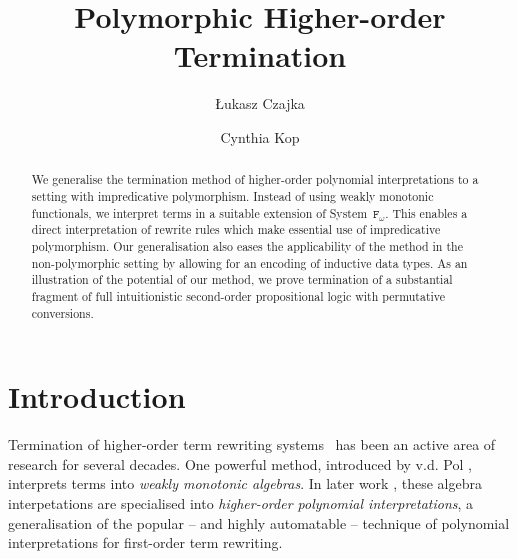 \documentclass[a4paper,UKenglish,cleveref,autoref,numberwithinsect]{lipics-v2019}
\title{Polymorphic Higher-order Termination}
\author{{\L}ukasz Czajka}{Faculty of Informatics, TU Dortmund, Germany \and \url{http://www.mimuw.edu.pl/~lukaszcz/} }{lukaszcz@mimuw.edu.pl}{https://orcid.org/0000-0001-8083-4280}{}
\author{Cynthia Kop}{Institute of Computer Science, Radboud University Nijmegen, Netherlands \and \url{https://www.cs.ru.nl/~cynthiakop/}}{c.kop@cs.ru.nl}{https://orcid.org/0000-0002-6337-2544}{}
\theoremstyle{definition}
\newcommand{\Fomega}{\mathtt{F}_\omega}
\begin{document}
\maketitle

\begin{abstract}
  We generalise the termination method of higher-order polynomial
  interpretations to a setting with impredicative
  polymorphism. Instead of using weakly monotonic functionals, we
  interpret terms in a suitable extension of System~$\Fomega$.
  This enables a direct interpretation of rewrite rules which
  make essential use of impredicative polymorphism.  Our
  generalisation also eases the applicability of the method
  in the non-polymorphic setting by allowing for an encoding
  of inductive data types.
  As an illustration of
  the potential of our method, we prove termination of a substantial
  fragment of full intuitionistic second-order propositional logic
  with permutative conversions.
\end{abstract}

\section{Introduction}

Termination of higher-order term rewriting
systems~\cite[Chapter~11]{Terese2003} has been an active area of
research for several decades.
One powerful method, introduced by v.d. Pol \cite{Pol1993,pol:96},
interprets terms into \emph{weakly monotonic algebras}.  In later work
\cite{FuhsKop2012,Kop2012}, these algebra interpetations are specialised
into \emph{higher-order polynomial interpretations}, a generalisation of
the popular -- and highly automatable -- technique of polynomial
interpretations for first-order term rewriting.
\end{document}
